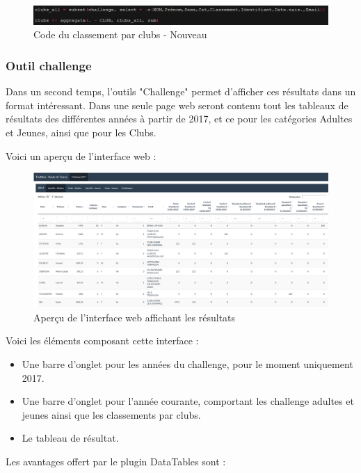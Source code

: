 \begin{figure}[!h]
	\center
	\includegraphics[scale=0.9]{img/codenew.PNG}
	\caption {Code du classement par clubs - Nouveau}
\end{figure}


\subsubsection{Outil challenge}

Dans un second temps, l'outils "Challenge" permet d'afficher ces résultats dans un format intéressant.
Dans une seule page web seront contenu tout les tableaux de résultats des différentes années à partir de 2017, et ce pour les catégories Adultes et Jeunes, ainsi que pour les Clubs.

Voici un aperçu de l'interface web :

\begin{figure}[!h]
	\center
	\includegraphics[scale=0.45]{img/online.PNG}
	\caption {Aperçu de l'interface web affichant les résultats}
\end{figure}

Voici les éléments composant cette interface :

\begin{itemize} 
	\item Une barre d'onglet pour les années du challenge, pour le moment uniquement 2017.
	\item Une barre d'onglet pour l'année courante, comportant les challenge adultes et jeunes ainsi que les classements par clubs.
	\item Le tableau de résultat.
\end{itemize}

Les avantages offert par le plugin DataTables sont :

